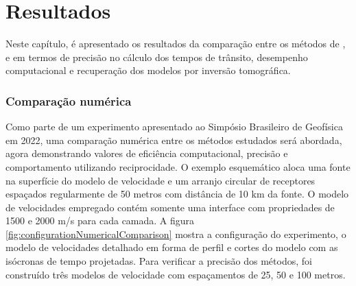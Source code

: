 \chapter{Resultados}
\label{ch:resultados}

Neste capítulo, é apresentado os resultados da comparação entre os métodos de ,  e  em termos de precisão no cálculo dos tempos de trânsito, desempenho computacional e recuperação dos modelos por inversão tomográfica. 

\subsection*{Comparação numérica}

Como parte de um experimento apresentado ao Simpósio Brasileiro de Geofísica em 2022, uma comparação numérica entre os métodos estudados será abordada, agora demonstrando valores de eficiência computacional, precisão e comportamento utilizando reciprocidade. O exemplo esquemático aloca uma fonte na superfície do modelo de velocidade e um arranjo circular de receptores espaçados regularmente de 50 metros com distância de 10 km da fonte. O modelo de velocidades empregado contém somente uma interface com propriedades de 1500 e 2000 m/s para cada camada. A figura \ref{fig:configurationNumericalComparison} mostra a configuração do experimento, o modelo de velocidades detalhado em forma de perfil e cortes do modelo com as isócronas de tempo projetadas. Para verificar a precisão dos métodos, foi construído três modelos de velocidade com espaçamentos de 25, 50 e 100 metros.  




